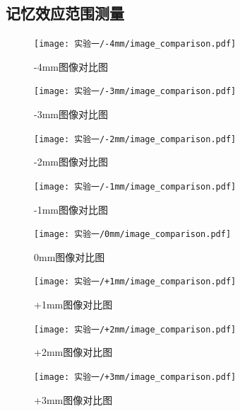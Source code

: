   



\subsection{记忆效应范围测量}

  


  \begin{figure}[H]
      \centering
      \texttt{[image: 实验一/-4mm/image\_comparison.pdf]}
      \caption{-4mm图像对比图}
      \label{fig:-4mm图像对比图}
  \end{figure}


  \begin{figure}[H]
      \centering
      \texttt{[image: 实验一/-3mm/image\_comparison.pdf]}
      \caption{-3mm图像对比图}
      \label{fig:-3mm图像对比图}
  \end{figure}


  \begin{figure}[H]
      \centering
      \texttt{[image: 实验一/-2mm/image\_comparison.pdf]}
      \caption{-2mm图像对比图}
      \label{fig:-2mm图像对比图}
  \end{figure}


  \begin{figure}[H]
      \centering
      \texttt{[image: 实验一/-1mm/image\_comparison.pdf]}
      \caption{-1mm图像对比图}
      \label{fig:-1mm图像对比图}
  \end{figure}


  \begin{figure}[H]
      \centering
      \texttt{[image: 实验一/0mm/image\_comparison.pdf]}
      \caption{0mm图像对比图}
      \label{fig:0mm图像对比图}
  \end{figure}


  \begin{figure}[H]
      \centering
      \texttt{[image: 实验一/+1mm/image\_comparison.pdf]}
      \caption{+1mm图像对比图}
      \label{fig:+1mm图像对比图}
  \end{figure}


  \begin{figure}[H]
      \centering
      \texttt{[image: 实验一/+2mm/image\_comparison.pdf]}
      \caption{+2mm图像对比图}
      \label{fig:+2mm图像对比图}
  \end{figure}


  \begin{figure}[H]
      \centering
      \texttt{[image: 实验一/+3mm/image\_comparison.pdf]}
      \caption{+3mm图像对比图}
      \label{fig:+3mm图像对比图}
  \end{figure}

